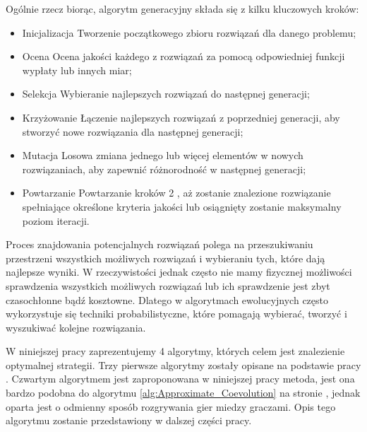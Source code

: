\documentclass[inzynierska]{pwr_wmat_praca_dyplomowa}
\theoremstyle{plain}
\numberwithin{theorem}{chapter}
\theoremstyle{definition}
\numberwithin{theorem}{chapter}
\begin{document}
	Ogólnie rzecz biorąc, algorytm generacyjny składa się z kilku kluczowych kroków:
	\begin{itemize}
		\item Inicjalizacja \pauza Tworzenie początkowego zbioru rozwiązań dla danego problemu;
		\item Ocena \pauza Ocena jakości każdego z rozwiązań za pomocą odpowiedniej funkcji wypłaty lub innych miar;
		\item Selekcja \pauza Wybieranie najlepszych rozwiązań do następnej generacji;
		\item Krzyżowanie \pauza Łączenie najlepszych rozwiązań z poprzedniej generacji, aby stworzyć nowe rozwiązania dla następnej generacji;
		\item Mutacja \pauza Losowa zmiana jednego lub więcej elementów w nowych rozwiązaniach, aby zapewnić różnorodność w następnej generacji;
		\item Powtarzanie \pauza Powtarzanie kroków 2 , aż zostanie znalezione rozwiązanie spełniające określone kryteria jakości lub osiągnięty zostanie maksymalny poziom iteracji.
	\end{itemize}	
	Proces znajdowania potencjalnych rozwiązań polega na przeszukiwaniu przestrzeni wszystkich możliwych rozwiązań i wybieraniu tych, które dają najlepsze wyniki. W rzeczywistości jednak często nie mamy fizycznej możliwości sprawdzenia wszystkich możliwych rozwiązań lub ich sprawdzenie jest zbyt czasochłonne bądź kosztowne. Dlatego w algorytmach ewolucyjnych często wykorzystuje się techniki probabilistyczne, które pomagają wybierać, tworzyć i wyszukiwać kolejne rozwiązania.
	
	W niniejszej pracy zaprezentujemy 4 algorytmy, których celem jest znalezienie optymalnej strategii. Trzy pierwsze algorytmy zostały opisane na podstawie pracy \cite{cauwet2018surprising}. Czwartym algorytmem jest zaproponowana w niniejszej pracy metoda, jest ona bardzo podobna do algorytmu \ref{alg:Approximate_Coevolution} na stronie \pageref{alg:Approximate_Coevolution}, jednak oparta jest o odmienny sposób rozgrywania gier miedzy graczami. Opis tego algorytmu zostanie przedstawiony w dalszej części pracy.
\end{document}

